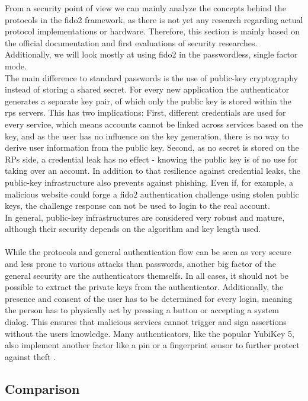 From a security point of view we can mainly analyze the concepts behind the protocols in the \ac{fido2} framework, as there is not yet any research regarding actual protocol implementations or hardware. Therefore, this section is mainly based on the official documentation and first evaluations of security researches. Additionally, we will look mostly at using \ac{fido2} in the passwordless, single factor mode.\\
The main difference to standard passwords is the use of public-key cryptography instead of storing a shared secret. For every new application the authenticator generates a separate key pair, of which only the public key is stored within the \acp{rp} servers. This has two implications: First, different credentials are used for every service, which means accounts cannot be linked across services based on the key, and as the user has no influence on the key generation, there is no way to derive user information from the public key. Second, as no secret is stored on the RPs side, a credential leak has no effect - knowing the public key is of no use for taking over an account. In addition to that resilience against credential leaks, the public-key infrastructure also prevents against phishing. Even if, for example, a malicious website could forge a \ac{fido2} authentication challenge using stolen public keys, the challenge response can not be used to login to the real account.\\
In general, public-key infrastructures are considered very robust and mature, although their security depends on the algorithm and key length used.\\
\\
While the protocols and general authentication flow can be seen as very secure and less prone to various attacks than passwords, another big factor of the general security are the authenticators themselfs. In all cases, it should not be possible to extract the private keys from the authenticator. Additionally, the presence and consent of the user has to be determined for every login, meaning the person has to physically act by pressing a button or accepting a system dialog. This ensures that malicious services cannot trigger and sign assertions without the users knowledge. Many authenticators, like the popular YubiKey 5, also implement another factor like a \ac{pin} or a fingerprint sensor to further protect against theft \cite{yubikey_5_nfc,dunkelberger2018}.


\subsection{Comparison}
\label{subsec:comparison}

